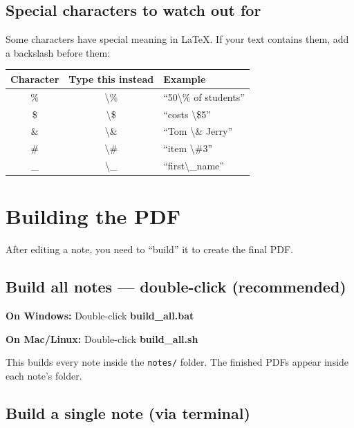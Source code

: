 \documentclass[a4paper,11pt]{article}
\begin{document}
\subsection{Special characters to watch out for}

Some characters have special meaning in LaTeX. If your text contains them, add a backslash before them:

\begin{center}
\begin{tabular}{c c l}
\toprule
\textbf{Character} & \textbf{Type this instead} & \textbf{Example} \\
\midrule
\% & \textbackslash\% & ``50\textbackslash\% of students'' \\
\$ & \textbackslash\$ & ``costs \textbackslash\$5'' \\
\& & \textbackslash\& & ``Tom \textbackslash\& Jerry'' \\
\# & \textbackslash\# & ``item \textbackslash\#3'' \\
\_ & \textbackslash\_ & ``first\textbackslash\_name'' \\
\bottomrule
\end{tabular}
\end{center}

\section{Building the PDF}

After editing a note, you need to ``build'' it to create the final PDF.

\subsection{Build all notes --- double-click (recommended)}

\begin{stepbox}
\textbf{On Windows:} Double-click \textbf{build\_all.bat}

\textbf{On Mac/Linux:} Double-click \textbf{build\_all.sh}

This builds every note inside the \texttt{notes/} folder. The finished PDFs appear inside each note's folder.
\end{stepbox}

\subsection{Build a single note (via terminal)}
\end{document}
